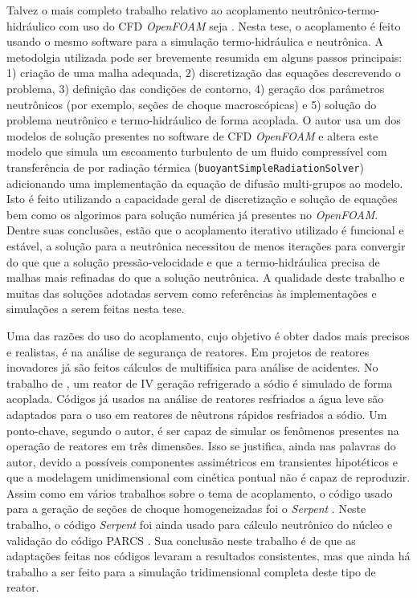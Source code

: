 \documentclass[12pt,openright,twoside,a4paper,english,french,spanish,brazil]{abntex2}
\begin{document}
Talvez o mais completo trabalho relativo ao acoplamento neutrônico-termo-hidráulico com uso do 
CFD \textit{OpenFOAM} seja \cite{Jareteg2012}. Nesta tese, o acoplamento é feito usando o mesmo 
software para a simulação termo-hidráulica e neutrônica. A metodolgia utilizada pode ser brevemente 
resumida em alguns passos principais: 1) criação de uma malha adequada, 2) discretização das 
equações descrevendo o problema, 3) definição das condições de contorno, 4) geração dos 
parâmetros neutrônicos (por exemplo, seções de choque macroscópicas) e 5) solução do 
problema neutrônico e termo-hidráulico de forma acoplada. O autor usa um dos modelos de solução presentes no 
software de CFD \textit{OpenFOAM} \cite{OpenFOAM2013} e 
altera este modelo que simula um escoamento turbulento de um fluido compressível com transferência de por radiação 
térmica (\texttt{buoyantSimpleRadiationSolver}) adicionando uma implementação da equação de difusão multi-grupos 
ao modelo. Isto é feito utilizando a capacidade geral de discretização e solução de equações bem como os algorimos 
para solução numérica já presentes no \textit{OpenFOAM}. Dentre suas conclusões, estão que o acoplamento iterativo 
utilizado é funcional e estável, a solução para a neutrônica necessitou de menos iterações para convergir 
do que que a solução pressão-velocidade e que a termo-hidráulica precisa de malhas mais refinadas do que a solução 
neutrônica. A qualidade deste trabalho e muitas das soluções adotadas servem como referências às implementações 
e simulações a serem feitas nesta tese.



Uma das razões do uso do acoplamento, cujo objetivo é obter dados mais precisos e realistas, é na 
análise de segurança de reatores. Em projetos de reatores inovadores já são feitos cálculos de multifísica para 
análise de acidentes. No trabalho de \cite{Lazaro2013}, um reator de IV geração refrigerado a sódio 
é simulado de forma acoplada. Códigos já usados na análise de reatores resfriados a água leve são adaptados 
para o uso em reatores de nêutrons rápidos resfriados a sódio. Um ponto-chave, segundo o autor, é ser capaz 
de simular os fenômenos presentes na operação de reatores em três dimensões. Isso se justifica, ainda nas 
palavras do autor, devido a possíveis componentes assimétricos em transientes hipotéticos e que 
a modelagem unidimensional com cinética pontual não é capaz de reproduzir. Assim como em vários trabalhos 
sobre o tema de acoplamento, o código usado para a geração de seções de choque homogeneizadas 
foi o \textit{Serpent} \cite{Serpent2013}. Neste trabalho, o código \textit{Serpent} foi ainda usado 
para cálculo neutrônico do núcleo e validação do código PARCS \cite{PARCS2006}. Sua conclusão neste trabalho 
é de que as adaptações feitas nos códigos levaram a resultados consistentes, mas que ainda há trabalho 
a ser feito para a simulação tridimensional completa deste tipo de reator.
\end{document}
